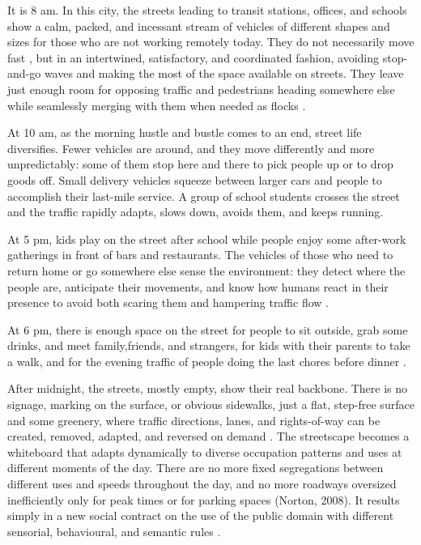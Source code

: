 It is 8 am. In this city, the streets leading to transit stations, offices, and schools show a calm, packed, and incessant stream of vehicles of different shapes and sizes for those who are not working remotely today. They do not necessarily move fast \citep{Gershenson2015}, but in an intertwined, satisfactory, and coordinated fashion, avoiding stop-and-go waves and making the most of the space available on streets. They leave just enough room for opposing traffic and pedestrians heading somewhere else while seamlessly merging with them when needed as flocks \citep{Jiang2006}. 

At 10 am, as the morning hustle and bustle comes to an end, street life diversifies. Fewer vehicles are around, and they move differently and more unpredictably: some of them stop here and there to pick people up or to drop goods off. Small delivery vehicles squeeze between larger cars and people \citep{9151337} to accomplish their last-mile service. A group of school students crosses the street and the traffic rapidly adapts, slows down, avoids them, and keeps running.

At 5 pm, kids play on the street after school while people enjoy some after-work gatherings in front of bars and restaurants. The vehicles of those who need to return home or go somewhere else sense the environment: they detect where the people are, anticipate their movements, and know how humans react in their presence to avoid both scaring them and hampering traffic flow  \citep{Ackermann2019, Millard-Ball2018}.

At 6 pm, there is enough space on the street for people to sit outside, grab some drinks, and meet family,friends, and strangers, for kids with their parents to take a walk, and for the evening traffic of people doing the last chores before dinner \citep{Ruiz-Apilanez2017}.

After midnight, the streets, mostly empty, show their real backbone. There is no signage, marking on the surface, or obvious sidewalks, just a flat, step-free \citep{Meyboom2018} surface and some greenery, where traffic directions, lanes, and rights-of-way can be created, removed, adapted, and reversed on demand \citep{Papageorgiou2021, Rieland2018}. The streetscape becomes a whiteboard that adapts dynamically to diverse occupation patterns and uses at different moments of the day. There are no more fixed segregations between different uses and speeds throughout the day, and no more roadways oversized inefficiently only for peak times or for parking spaces (Norton, 2008). It results simply in a new social contract on the use of the public domain with different sensorial, behavioural, and semantic rules \citep{Fernandez-Abascal2019}.

